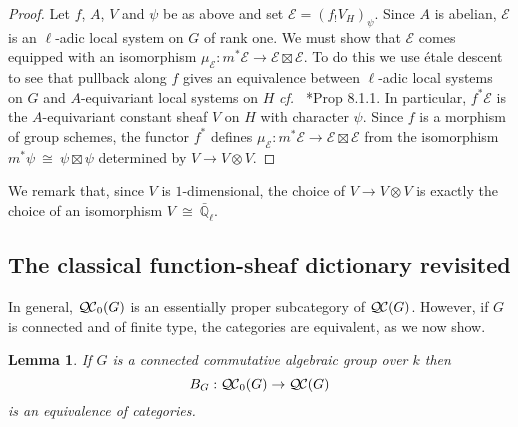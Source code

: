 \documentclass[10pt]{amsart}
\theoremstyle{plain}
\newtheorem{lemma}[theorem]{Lemma}
\theoremstyle{definition}
\theoremstyle{remark}
\newcommand{\EE}{\mathbb{\bar Q}_\ell}
\newcommand{\Fq}{k}
\newcommand{\iso}{{\ \cong\ }}
\newcommand{\qcs}[1]{{\mathcal{#1}}}
\newcommand{\QC}{{\mathcal{Q\hskip-0.8pt C}}}
\newcommand{\bQC}{{\QC_0}}
\begin{document}
\begin{proof}
Let $f$, $A$, $V$ and $\psi$ be as above and set $\qcs{E} = (f_! V_H)_\psi$.
Since $A$ is abelian, $\qcs{E}$ is an $\ell$-adic local system on $G$ of rank one.
We must show that $\qcs{E}$ comes equipped with an isomorphism $\mu_\qcs{E} : m^* \qcs{E} \to \qcs{E}\boxtimes\qcs{E}$.
To do this we use \'etale descent to see that pullback along $f$ gives an equivalence between $\ell$-adic local systems on $G$ and $A$-equivariant local systems on $H$ {\it cf.\ } \cite{bernstein-luntz:equivariant_sheaves}*{Prop 8.1.1}. 
In particular, $f^*\qcs{E}$ is the $A$-equivariant constant sheaf $V$ on $H$ with character $\psi$.
Since $f$ is a morphism of group schemes, the functor $f^*$ defines $\mu_\qcs{E} : m^*\qcs{E} \to \qcs{E}\boxtimes\qcs{E}$
from the isomorphism $m^*\psi \iso \psi \boxtimes\psi$ determined by $V\to V\otimes V$.
\end{proof}

We remark that, since $V$ is $1$-dimensional, the choice of $V \to V\otimes V$ is exactly the choice of an isomorphism $V\iso \EE$.

\subsection{The classical function-sheaf dictionary revisited}\label{ssec:connected}

In general, $\bQC(G)$ is an essentially
proper subcategory of $\QC(G)$. 
However, if $G$ is connected and of finite type, the categories are equivalent, as we now show.

\begin{lemma}\label{lem:bounded_connected}
If $G$ is a connected commutative algebraic group over $\Fq$ then 
\[
B_G : \bQC(G) \to \QC(G)
\]
 is an equivalence of categories.
\end{lemma}
\end{document}
